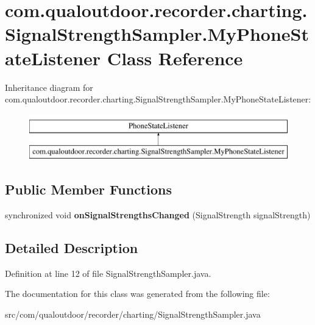 \hypertarget{classcom_1_1qualoutdoor_1_1recorder_1_1charting_1_1SignalStrengthSampler_1_1MyPhoneStateListener}{\section{com.\-qualoutdoor.\-recorder.\-charting.\-Signal\-Strength\-Sampler.\-My\-Phone\-State\-Listener Class Reference}
\label{classcom_1_1qualoutdoor_1_1recorder_1_1charting_1_1SignalStrengthSampler_1_1MyPhoneStateListener}
}
Inheritance diagram for com.\-qualoutdoor.\-recorder.\-charting.\-Signal\-Strength\-Sampler.\-My\-Phone\-State\-Listener\-:\begin{figure}[H]
\begin{center}
\leavevmode
\includegraphics[height=2.000000cm]{classcom_1_1qualoutdoor_1_1recorder_1_1charting_1_1SignalStrengthSampler_1_1MyPhoneStateListener}
\end{center}
\end{figure}
\subsection*{Public Member Functions}
\begin{DoxyCompactItemize}
\item 
\hypertarget{classcom_1_1qualoutdoor_1_1recorder_1_1charting_1_1SignalStrengthSampler_1_1MyPhoneStateListener_a688de7dc88ac8f32892425e9c4663aad}{synchronized void {\bfseries on\-Signal\-Strengths\-Changed} (Signal\-Strength signal\-Strength)}\label{classcom_1_1qualoutdoor_1_1recorder_1_1charting_1_1SignalStrengthSampler_1_1MyPhoneStateListener_a688de7dc88ac8f32892425e9c4663aad}

\end{DoxyCompactItemize}


\subsection{Detailed Description}


Definition at line 12 of file Signal\-Strength\-Sampler.\-java.



The documentation for this class was generated from the following file\-:\begin{DoxyCompactItemize}
\item 
src/com/qualoutdoor/recorder/charting/Signal\-Strength\-Sampler.\-java\end{DoxyCompactItemize}
